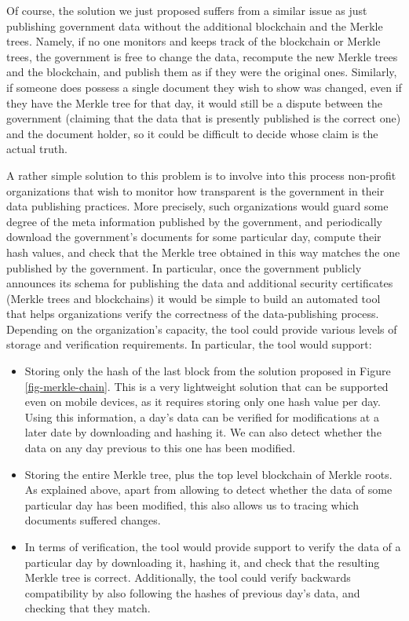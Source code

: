\medskip
{} Of course, the solution we just proposed suffers from a similar issue as just publishing government data without the additional blockchain and the Merkle trees. Namely, if no one monitors and keeps track of the blockchain or Merkle trees, the government is free to change the data, recompute the new Merkle trees and the blockchain, and publish them as if they were the original ones. Similarly, if someone does possess a single document they wish to show was changed, even if they have the Merkle tree for that day, it would still be a dispute between the government (claiming that the data that is presently published is the correct one) and the document holder, so it could be difficult to decide whose claim is the actual truth.

A rather simple solution to this problem is to involve into this process non-profit organizations that wish to monitor how transparent is the government in their data publishing practices. More precisely, such organizations would guard some degree of the meta information published by the government, and periodically download the government's documents for some particular day, compute their hash values, and check that the Merkle tree obtained in this way matches the one published by the government. In particular, once the government publicly announces its schema for publishing the data and additional security certificates (Merkle trees and blockchains) it would be simple to build an automated tool that helps organizations verify the correctness of the data-publishing process. Depending on  the organization's capacity, the tool could provide various levels of storage and verification requirements. In particular, the tool would support:
\begin{itemize}
\item Storing only the hash of the last block from the solution proposed in Figure \ref{fig-merkle-chain}. This is a very lightweight solution that can be supported even on mobile devices, as it requires storing only one hash value per day. Using this information, a day's data can be verified for modifications at a later date by downloading and hashing it. We can also detect whether the data on any day previous to this one has been modified.
\item Storing the entire Merkle tree, plus the top level blockchain of Merkle roots. As explained above, apart from allowing to detect whether the data of some particular day has been modified, this also allows us to  tracing which documents suffered changes.
\item In terms of verification, the tool would provide support to verify the data of a particular day by downloading it, hashing it, and check that the resulting Merkle tree is correct. Additionally, the tool could verify backwards compatibility by also following the hashes of previous day's data, and checking that they match.
\end{itemize}

